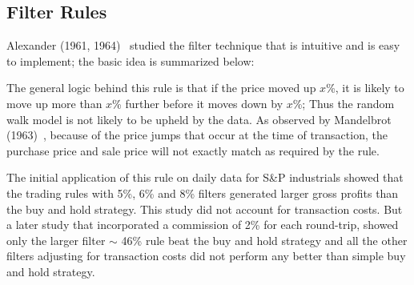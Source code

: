 \subsection{Filter Rules} \label{in:filter1}

Alexander (1961, 1964)~\cite{alexander61,alexander64} studied the filter technique that is intuitive and is easy to implement; the basic idea is summarized below: \medbreak

\begin{center}
\end{center} \twomedskip


The general logic behind this rule is that if the price moved up $x$\%, it is likely to move up more than $x$\% further before it moves down by $x$\%; Thus the random walk model is not likely to be upheld by the data. As observed by Mandelbrot (1963)~\cite{mandelbrot}, because of the price jumps that occur at the time of transaction, the purchase price and sale price will not exactly match as required by the rule.


The initial application of this rule on daily data for S\&P industrials showed that the trading rules with 5\%, 6\% and 8\% filters generated larger gross profits than the buy and hold strategy. This study did not account for transaction costs. But a later study that incorporated a commission of 2\% for each round-trip, showed only the larger filter  $\sim$ 46\% rule beat the buy and hold strategy and all the other filters adjusting for transaction costs did not perform any better than simple buy and hold  strategy. 


